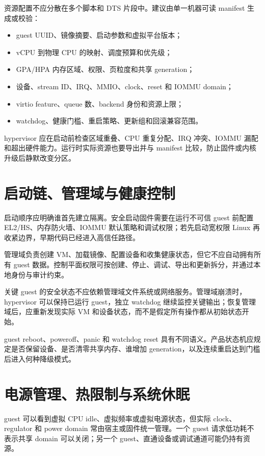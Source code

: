 资源配置不应分散在多个脚本和 DTS 片段中。建议由单一机器可读 manifest 生成或校验：

\begin{itemize}
  \item guest UUID、镜像摘要、启动参数和虚拟平台版本；
  \item vCPU 到物理 CPU 的映射、调度预算和优先级；
  \item GPA/HPA 内存区域、权限、页粒度和共享 generation；
  \item 设备、stream ID、IRQ、MMIO、clock、reset 和 IOMMU domain；
  \item virtio feature、queue 数、backend 身份和资源上限；
  \item watchdog、健康门槛、重启策略、更新组和回滚兼容范围。
\end{itemize}

hypervisor 应在启动前检查区域重叠、CPU 重复分配、IRQ 冲突、IOMMU 漏配和超出硬件能力。运行时实际资源也要导出并与 manifest 比较，防止固件或内核升级后静默改变分区。

\section{启动链、管理域与健康控制}

启动顺序应明确谁首先建立隔离。安全启动固件需要在运行不可信 guest 前配置 EL2/HS、内存防火墙、IOMMU 默认策略和调试权限；若先启动宽权限 Linux 再收紧边界，早期代码已经进入高信任路径。

管理域负责创建 VM、加载镜像、配置设备和收集健康状态，但它不应自动拥有所有 guest 数据。控制平面权限可按创建、停止、调试、导出和更新拆分，并通过本地身份与审计约束。

关键 guest 的安全状态不应依赖管理域文件系统或网络服务。管理域崩溃时，hypervisor 可以保持已运行 guest，独立 watchdog 继续监控关键输出；恢复管理域后，应重新发现实际 VM 和设备状态，而不是假定所有操作都从初始状态开始。

guest reboot、poweroff、panic 和 watchdog reset 具有不同语义。产品状态机应规定是否保留设备、是否清零共享内存、谁增加 generation，以及连续重启达到门槛后进入何种降级模式。

\section{电源管理、热限制与系统休眠}

guest 可以看到虚拟 CPU idle、虚拟频率或虚拟电源状态，但实际 clock、regulator 和 power domain 常由宿主或固件统一管理。一个 guest 请求低功耗不表示共享 domain 可以关闭；另一个 guest、直通设备或调试通道可能仍持有资源。

